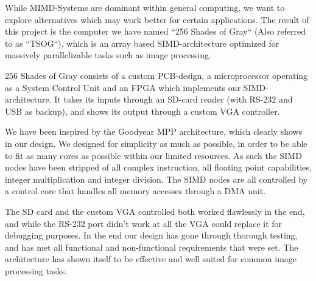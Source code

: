 While MIMD-Systems are dominant within general computing, we want to explore
alternatives which may work better for certain applications. The result of
this project is the computer we have named ``256 Shades of Gray`` (Also referred
to as ``TSOG``), which is an array based SIMD-architecture optimized for massively
parallelizable tasks such as image processing.

256 Shades of Gray consists of a custom PCB-design, a microprocessor operating as a
System Control Unit and an FPGA which implements our SIMD-architecture. It takes its
inputs through an SD-card reader (with RS-232 and USB as backup), and shows its
output through a custom VGA controller.

We have been inspired by the Goodyear MPP architecture, which clearly shows in our
design. We designed for simplicity as much as possible, in order to be able to fit
as many cores as possible within our limited resources. As such the SIMD nodes have
been stripped of all complex instruction, all floating point capabilities, integer
multiplication and integer division. The SIMD nodes are all controlled by a control
core that handles all memory accesses through a DMA unit.

The SD card and the custom VGA controlled both worked flawlessly in the end, and while
the RS-232 port didn't work at all the VGA could replace it for debugging purposes.
In the end our design has gone through thorough testing, and has met all functional
and non-functional requirements that were set. The architecture has shown itself to
be effective and well suited for common image processing tasks.
\endgroup
